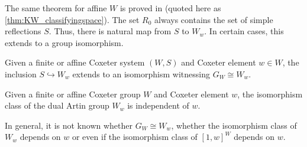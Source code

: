 \documentclass[class=article, crop=false]{standalone}
\begin{document}
The same theorem for affine $W$ is proved in \cite{paolini_salvetti_kpi1_2021} (quoted here as \cref{thm:KW_classifyingspace}). The set $R_0$ always contains the set of simple reflections $S$. Thus, there is natural map from $S$ to $W_w$. In certain cases, this extends to a group isomorphism.

\begin{theorem}
	Given a finite \cite[Theorem 2.2.5]{bessis_dual_2003} or affine \cite[Theorem C]{mccammond_sulway_artin_2017} Coxeter system $(W,S)$ and Coxeter element $w \in W$, the inclusion $S \hookrightarrow W_w$ extends to an isomorphism witnessing $G_W \cong W_w$.
	\label{thm:dual_artin_iso_artin}
\end{theorem}
\begin{corollary}
	Given a finite or affine Coxeter group $W$ and Coxeter element $w$, the isomorphism class of the dual Artin group $W_w$ is independent of $w$.
\end{corollary}

In general, it is not known whether $G_W \cong W_w$, whether the isomorphism class of $W_w$ depends on $w$ or even if the isomorphism class of $[1,w]^W$ depends on $w$.
\end{document}
